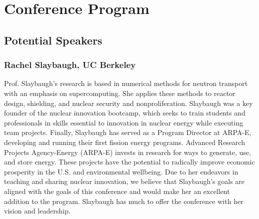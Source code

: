 \section{Conference Program}

\subsection{Potential Speakers}

\subsubsection{Rachel Slaybaugh, UC Berkeley}
Prof. Slaybaugh's research is based in numerical methods for neutron transport with an emphasis on supercomputing. She applies these methods to reactor design, shielding, and nuclear security and nonproliferation. Slaybaugh was a key founder of the nuclear innovation bootcamp, which seeks to train students and professionals in skills essential to innovation in nuclear energy while executing team projects. Finally, Slaybaugh has served as a Program Director at ARPA-E, developing and running their first fission energy programs. Advanced Research Projects Agency-Energy (ARPA-E) invests in research for ways to generate, use, and store energy. These projects have the potential to radically improve economic prosperity in the U.S. and environmental wellbeing. Due to her endeavors in teaching and sharing nuclear innovation, we believe that Slaybaugh's goals are aligned with the goals of this conference and would make her an excellent addition to the program. Slaybaugh has much to offer the conference with her vision and leadership.

